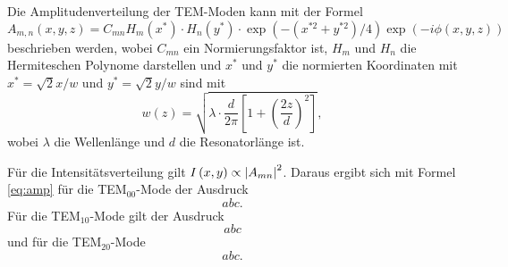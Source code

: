 Die Amplitudenverteilung der TEM-Moden kann mit der Formel 
\begin{equation}
    A_{m,n}\left(x,y,z\right) = C_{mn} H_m\left(x^*\right)\cdot H_n\left(y^*\right) \cdot \exp\left(-\left( x^{*2} + y^{*2} \right)/4 \right) \exp\left( -i \phi \left( x,y,z \right)\right) 
    \label{eq:amp}
\end{equation}
beschrieben werden, wobei $C_{mn}$ ein Normierungsfaktor ist, $H_m$ und $H_n$ die Hermiteschen Polynome darstellen und $x^*$ und $y^*$ die normierten Koordinaten mit $x^*= \sqrt{2} x/w$ und  $y^*= \sqrt{2} y/w$ sind mit 
\begin{equation*}
    w(z) = \sqrt{\lambda \cdot \frac{d}{2\pi}\left[ 1 + \left(\frac{2z}{d} \right)^2 \right]},
\end{equation*}
wobei $\lambda$ die Wellenlänge und $d$ die Resonatorlänge ist.

Für die Intensitätsverteilung gilt $I\left(x,y\right) \propto \absolutevalue{A_{mn}}^2$. Daraus ergibt sich mit Formel \eqref{eq:amp} für die 
TEM$_{00}$-Mode der Ausdruck 
\begin{equation}
    abc.
    \label{eq:mode0}
\end{equation}
Für die 
TEM$_{10}$-Mode gilt der Ausdruck 
\begin{equation}
    abc
    \label{eq:mode1}
\end{equation}
und für die 
TEM$_{20}$-Mode 
\begin{equation}
    abc .
    \label{eq:mode2}
\end{equation}








